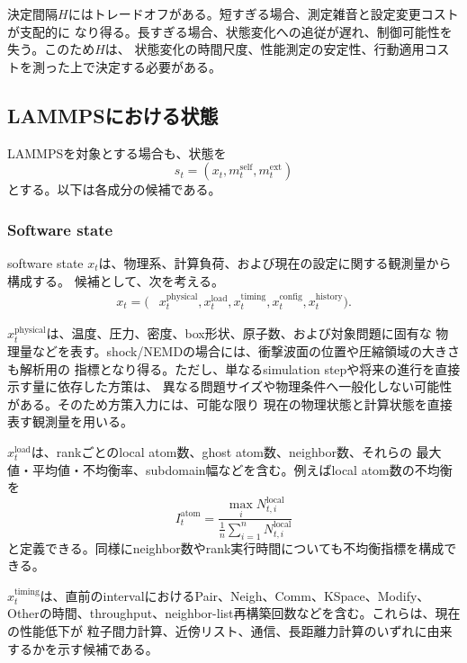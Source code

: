 決定間隔$H$にはトレードオフがある。短すぎる場合、測定雑音と設定変更コストが支配的に
なり得る。長すぎる場合、状態変化への追従が遅れ、制御可能性を失う。このため$H$は、
状態変化の時間尺度、性能測定の安定性、行動適用コストを測った上で決定する必要がある。

\subsection{LAMMPSにおける状態}

LAMMPSを対象とする場合も、状態を
\begin{equation}
  s_t=(x_t,m_t^{\mathrm{self}},m_t^{\mathrm{ext}})
\end{equation}
とする。以下は各成分の候補である。

\subsubsection{Software state}

software state $x_t$は、物理系、計算負荷、および現在の設定に関する観測量から構成する。
候補として、次を考える。
\begin{equation}
  \begin{aligned}
  x_t = (&x_t^{\mathrm{physical}},x_t^{\mathrm{load}},
          x_t^{\mathrm{timing}},x_t^{\mathrm{config}},
          x_t^{\mathrm{history}}).
  \end{aligned}
\end{equation}

$x_t^{\mathrm{physical}}$は、温度、圧力、密度、box形状、原子数、および対象問題に固有な
物理量などを表す。shock/NEMDの場合には、衝撃波面の位置や圧縮領域の大きさも解析用の
指標となり得る。ただし、単なるsimulation stepや将来の進行を直接示す量に依存した方策は、
異なる問題サイズや物理条件へ一般化しない可能性がある。そのため方策入力には、可能な限り
現在の物理状態と計算状態を直接表す観測量を用いる。

$x_t^{\mathrm{load}}$は、rankごとのlocal atom数、ghost atom数、neighbor数、それらの
最大値・平均値・不均衡率、subdomain幅などを含む。例えばlocal atom数の不均衡を
\begin{equation}
 I_t^{\mathrm{atom}}
 =\frac{\max_i N_{t,i}^{\mathrm{local}}}
        {\frac{1}{n}\sum_{i=1}^{n}N_{t,i}^{\mathrm{local}}}
\end{equation}
と定義できる。同様にneighbor数やrank実行時間についても不均衡指標を構成できる。

$x_t^{\mathrm{timing}}$は、直前のintervalにおけるPair、Neigh、Comm、KSpace、Modify、
Otherの時間、throughput、neighbor-list再構築回数などを含む。これらは、現在の性能低下が
粒子間力計算、近傍リスト、通信、長距離力計算のいずれに由来するかを示す候補である。

